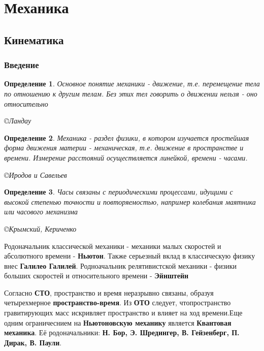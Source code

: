 \documentclass{article}
\newtheorem{theorem}{Определение} %
\begin{document}
 
\tableofcontents
 
\section{Механика}


\subsection{Кинематика}
\subsubsection{Введение}
\begin{theorem}
Основное понятие механики - движение, т.е. перемещение тела по отношению к другим телам. Без этих тел говорить о движении нельзя - оно относительно

\copyright{Ландау}
\end{theorem}


\begin{theorem}
Механика - раздел физики, в котором изучается простейшая форма движения материи - механическая, т.е. движение в пространстве и времени. Измерение расстояний осуществляется линейкой, времени - часами.

\copyright{Иродов и Савельев}
\end{theorem}

\begin{theorem}
Часы связаны с периодическими процессами, идущими с высокой степенью точности и повторяемостью, например колебания маятника или часового механизма

\copyright{Крымский, Кериченко}
\end{theorem}



Родоначальник классической механики - механики малых скоростей и абсолютного времени - \textbf{Ньютон}. Также серьезный вклад в классическую физику внес \textbf{Галилео Галилей}. Родноачальник релятивистской механики - физики больших скоростей и относительного времени - \textbf{Эйнштейн}

Согласно \textbf{СТО}, пространство и время неразрывно связаны, образуя четырехмерное \textbf{пространство-время}. Из \textbf{ОТО} следует, чтопространство гравитирующих масс искривляет пространство и влияет на ход времени.Еще одним ограничеснием на \textbf{Ньютоновскую механику} является \textbf{Квантовая механика}. Её родоначальники: \textbf{Н. Бор, Э. Шредингер, В. Гейзенберг, П. Дирак, В. Паули}.
\end{document}
